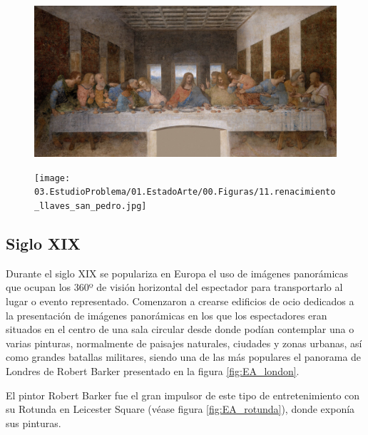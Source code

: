 \begin{figure}
\centering
\begin{minipage}{.5\textwidth}
  \centering
  \includegraphics[width=.9\linewidth]{03.EstudioProblema/01.EstadoArte/00.Figuras/10.renacimiento_ultima_cena.jpg}
  \label{fig:EA_cenaLeonardo}
\end{minipage}%
\begin{minipage}{.5\textwidth}
  \centering
  \texttt{[image: 03.EstudioProblema/01.EstadoArte/00.Figuras/11.renacimiento\_llaves\_san\_pedro.jpg]}
  \label{fig:EA_llaves}
\end{minipage}
\end{figure}






\subsection{Siglo XIX}

Durante el siglo XIX se populariza en Europa el uso de imágenes panorámicas que ocupan los 360º de visión horizontal del espectador para transportarlo al lugar o evento representado. Comenzaron a crearse edificios de ocio dedicados a la presentación de imágenes panorámicas en los que los espectadores eran situados en el centro de una sala circular desde donde podían contemplar una o varias pinturas, normalmente de paisajes naturales, ciudades y zonas urbanas, así como grandes batallas militares, siendo una de las más populares el panorama de Londres de Robert Barker presentado en la figura \ref{fig:EA_london}.

El pintor Robert Barker fue el gran impulsor de este tipo de entretenimiento con su Rotunda en Leicester Square (véase figura \ref{fig:EA_rotunda}), donde exponía sus pinturas.



